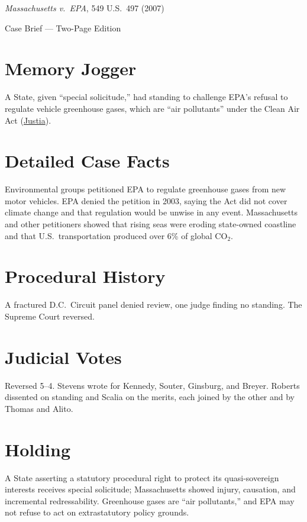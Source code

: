 \documentclass[12pt]{article}
\begin{document}
\begin{center}
{\LARGE \textit{Massachusetts v.\ EPA}, 549 U.S.\ 497 (2007)\par}
\vspace{0.5em}
{\large Case Brief --- Two-Page Edition\par}
\end{center}

\section{Memory Jogger}
A State, given ``special solicitude,'' had standing to challenge EPA's refusal to regulate vehicle greenhouse gases, which are ``air pollutants'' under the Clean Air Act (\href{https://supreme.justia.com/cases/federal/us/549/497/}{Justia}).

\section{Detailed Case Facts}
Environmental groups petitioned EPA to regulate greenhouse gases from new motor vehicles. EPA denied the petition in 2003, saying the Act did not cover climate change and that regulation would be unwise in any event. Massachusetts and other petitioners showed that rising seas were eroding state-owned coastline and that U.S.\ transportation produced over 6\% of global $\mathrm{CO_2}$.

\section{Procedural History}
A fractured D.C.\ Circuit panel denied review, one judge finding no standing. The Supreme Court reversed.

\section{Judicial Votes}
Reversed 5--4. Stevens wrote for Kennedy, Souter, Ginsburg, and Breyer. Roberts dissented on standing and Scalia on the merits, each joined by the other and by Thomas and Alito.

\section{Holding}
A State asserting a statutory procedural right to protect its quasi-sovereign interests receives special solicitude; Massachusetts showed injury, causation, and incremental redressability. Greenhouse gases are ``air pollutants,'' and EPA may not refuse to act on extrastatutory policy grounds.
\end{document}
